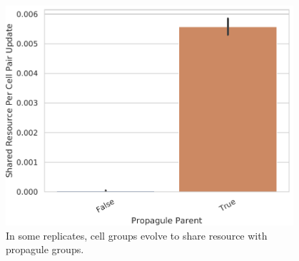 \begin{figure}
\begin{columns}
\begin{column}{0.75\textwidth}
  \includegraphics[width=\textwidth]{img/treat=resource-wave__channelsense-yes__nlev-two+seed=1018+title=propagule_parent_resource_contributed+ext=}
\end{column}
\begin{column}{0.25\textwidth}
  \caption{
  In some replicates, cell groups evolve to share resource with propagule groups.
  }
  \label{fig:endowment}
\end{column}
\end{columns}
\end{figure}
